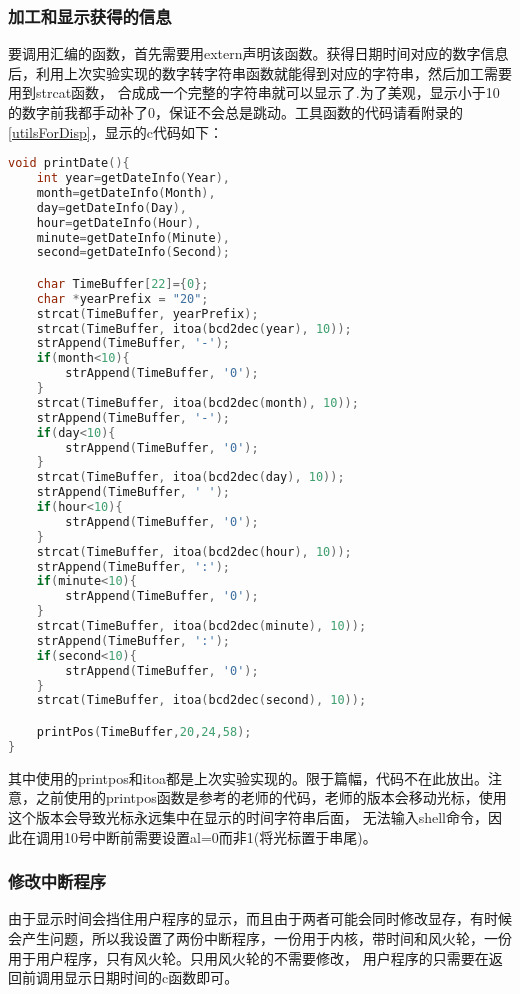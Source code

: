 \documentclass[a4paper, 11pt]{article} %
\begin{document}
\subsubsection{加工和显示获得的信息}
要调用汇编的函数，首先需要用extern声明该函数。获得日期时间对应的数字信息后，利用上次实验实现的数字转字符串函数就能得到对应的字符串，然后加工需要用到strcat函数，
合成成一个完整的字符串就可以显示了.为了美观，显示小于10的数字前我都手动补了0，保证不会总是跳动。工具函数的代码请看附录的\ref{utilsForDisp}，显示的c代码如下：
\begin{lstlisting}[language={c},label=split,caption=split]
  void printDate(){
    int year=getDateInfo(Year),
    month=getDateInfo(Month),
    day=getDateInfo(Day),
    hour=getDateInfo(Hour),
    minute=getDateInfo(Minute),
    second=getDateInfo(Second);

    char TimeBuffer[22]={0};
    char *yearPrefix = "20";
    strcat(TimeBuffer, yearPrefix);
    strcat(TimeBuffer, itoa(bcd2dec(year), 10));
    strAppend(TimeBuffer, '-');
    if(month<10){
        strAppend(TimeBuffer, '0');
    }
    strcat(TimeBuffer, itoa(bcd2dec(month), 10));
    strAppend(TimeBuffer, '-');
    if(day<10){
        strAppend(TimeBuffer, '0');
    }
    strcat(TimeBuffer, itoa(bcd2dec(day), 10));
    strAppend(TimeBuffer, ' ');
    if(hour<10){
        strAppend(TimeBuffer, '0');
    }
    strcat(TimeBuffer, itoa(bcd2dec(hour), 10));
    strAppend(TimeBuffer, ':');
    if(minute<10){
        strAppend(TimeBuffer, '0');
    }
    strcat(TimeBuffer, itoa(bcd2dec(minute), 10));
    strAppend(TimeBuffer, ':');
    if(second<10){
        strAppend(TimeBuffer, '0');
    }
    strcat(TimeBuffer, itoa(bcd2dec(second), 10));

    printPos(TimeBuffer,20,24,58);
}
\end{lstlisting}
其中使用的printpos和itoa都是上次实验实现的。限于篇幅，代码不在此放出。注意，之前使用的printpos函数是参考的老师的代码，老师的版本会移动光标，使用这个版本会导致光标永远集中在显示的时间字符串后面，
无法输入shell命令，因此在调用10号中断前需要设置al=0而非1(将光标置于串尾)。

\subsubsection{修改中断程序}
由于显示时间会挡住用户程序的显示，而且由于两者可能会同时修改显存，有时候会产生问题，所以我设置了两份中断程序，一份用于内核，带时间和风火轮，一份用于用户程序，只有风火轮。只用风火轮的不需要修改，
用户程序的只需要在返回前调用显示日期时间的c函数即可。
\end{document}
